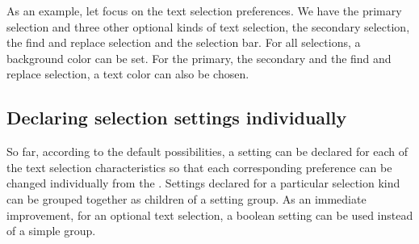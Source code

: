 \documentclass[a4paper,10pt,twoside]{book}
\begin{document}
{As an example, let focus on the text selection preferences. We have the primary selection and three other optional kinds of text selection, the secondary selection, the find and replace selection and the selection bar. For all selections, a background color can be set. For the primary, the secondary and the find and replace selection, a text color can also be chosen.

\subsection{Declaring selection settings individually}
So far, according to the default possibilities, a setting can be declared for each of the text selection characteristics so that each corresponding preference can be changed individually from the \setbrowser. Settings declared for a particular selection kind can be grouped together as children of a setting group. As an immediate improvement, for an optional text selection, a boolean setting can be used instead of a simple group.

}
\end{document}

